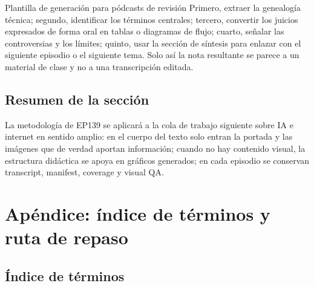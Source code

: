 \documentclass[a4paper]{article}
\begin{document}
\begin{knowledgebox}{Plantilla de generación para pódcasts de revisión}
Primero, extraer la genealogía técnica; segundo, identificar los términos centrales; tercero, convertir los juicios expresados de forma oral en tablas o diagramas de flujo; cuarto, señalar las controversias y los límites; quinto, usar la sección de síntesis para enlazar con el siguiente episodio o el siguiente tema. Solo así la nota resultante se parece a un material de clase y no a una transcripción editada.
\end{knowledgebox}

\subsection{Resumen de la sección}

La metodología de EP139 se aplicará a la cola de trabajo siguiente sobre IA e internet en sentido amplio: en el cuerpo del texto solo entran la portada y las imágenes que de verdad aportan información; cuando no hay contenido visual, la estructura didáctica se apoya en gráficos generados; en cada episodio se conservan transcript, manifest, coverage y visual QA.


\section{Apéndice: índice de términos y ruta de repaso}

\subsection{Índice de términos}
\end{document}
